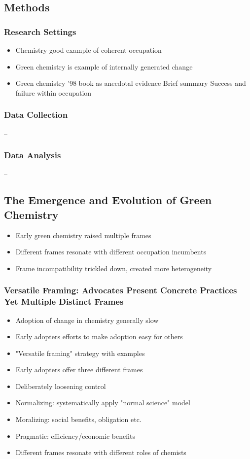 \documentclass{article}
\begin{document}
	\subsection*{Methods}
	
	\subsubsection*{Research Settings}
	\begin{itemize}
		\item Chemistry good example of coherent occupation
		\item Green chemistry is example of internally generated change
		\item Green chemistry '98 book as anecdotal evidence
			\subitem Brief summary
			\subitem Success and failure within occupation
	\end{itemize}
	
	\subsubsection*{Data Collection}
	--
	
	\subsubsection*{Data Analysis}
	--
	
	\subsection*{The Emergence and Evolution of Green Chemistry}
	\begin{itemize}
		\item Early green chemistry raised multiple frames
		\item Different frames resonate with different occupation incumbents
		\item Frame incompatibility trickled down, created more heterogeneity
	\end{itemize}
	
	\subsubsection*{Versatile Framing: Advocates Present Concrete Practices Yet Multiple Distinct Frames}
	\begin{itemize}
		\item Adoption of change in chemistry generally slow
		\item Early adopters efforts to make adoption easy for others
			\item "Versatile framing" strategy with examples
		\item Early adopters offer three different frames
			\item Deliberately loosening control
			\item Normalizing: systematically apply "normal science" model
			\item Moralizing: social benefits, obligation etc.
			\item Pragmatic: efficiency/economic benefits
			\item Different frames resonate with different roles of chemists		
	\end{itemize}
\end{document}
